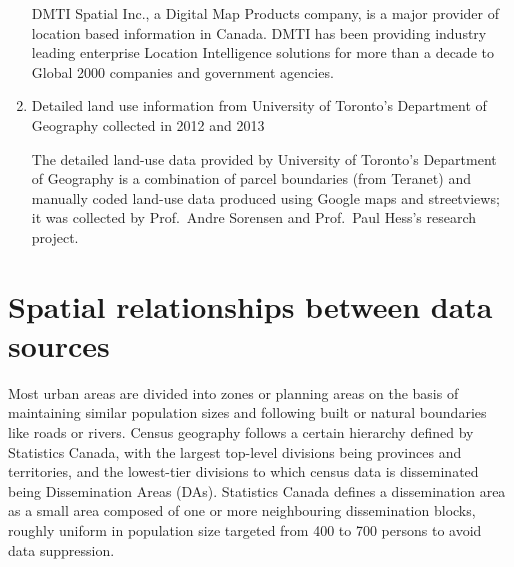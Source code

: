 \begin{enumerate}
    DMTI Spatial Inc., a Digital Map Products company, is a major provider of location based information in Canada.
    DMTI has been providing industry leading enterprise Location Intelligence solutions for more than a decade to Global 2000 companies and government agencies\cite{DMTISpatialInc.2014}.

    \item Detailed land use information from University of Toronto's Department of Geography collected in 2012 and 2013

    The detailed land-use data provided by University of Toronto's Department of Geography is a combination of parcel boundaries (from Teranet) and manually coded land-use data produced using Google maps and streetviews;
    it was collected by Prof.\ Andre Sorensen and Prof.\ Paul Hess's research project.

\end{enumerate}

\section{Spatial relationships between data sources} \label{sec:spatial_relationships}

Most urban areas are divided into zones or planning areas on the basis of maintaining similar population sizes and following built or natural boundaries like roads or rivers.
Census geography follows a certain hierarchy defined by Statistics Canada, with the largest top-level divisions being provinces and territories, and the lowest-tier divisions to which census data is disseminated being Dissemination Areas (DAs)\cite{StatisticsCanada2018}.
Statistics Canada defines a dissemination area as a small area composed of one or more neighbouring dissemination blocks, roughly uniform in population size targeted from 400 to 700 persons to avoid data suppression\cite{StatisticsCanada2015}.

